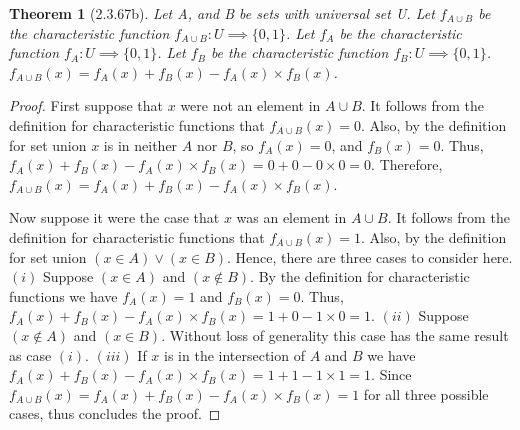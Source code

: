 \documentclass[a4paper, 12pt]{article}
\theoremstyle{plain}
\newtheorem*{theorem*}{Theorem}
\begin{document}
	
	\begin{theorem*}[2.3.67b]
		Let A, and B be sets with universal set U. Let $f_{A \cup B}$ be the characteristic 
		function $f_{A \cup B}: U \implies \{0, 1\}$. Let $f_{A}$ be the characteristic 
		function $f_{A}: U \implies \{0, 1\}$. Let $f_{B}$ be the characteristic function 
		\newline $f_{B}: U \implies \{0, 1\}$. \newline 
		$f_{A \cup B}(x) = f_{A}(x) + f_{B}(x) - f_{A}(x) \times f_{B}(x)$.
	\end{theorem*}
	
	\begin{proof}
		First suppose that $x$ were not an element in $A \cup B$. It follows from the definition 
		for characteristic functions that $f_{A \cup B}(x) = 0$. Also, by the definition for set 
		union $x$ is in neither $A$ nor $B$, so $f_{A}(x) = 0$, and $f_{B}(x) = 0$. Thus, 
		$f_{A}(x) + f_{B}(x) - f_{A}(x) \times f_{B}(x) = 0 + 0 - 0 \times 0 = 0$. Therefore, 
		$f_{A \cup B}(x) = f_{A}(x) + f_{B}(x) - f_{A}(x) \times f_{B}(x)$.
		
		Now suppose it were the case that $x$ was an element in $A \cup B$. It follows from the 
		definition for characteristic functions that $f_{A \cup B}(x) = 1$. Also, by the definition 
		for set union $(x \in A) \lor (x \in B)$. Hence, there are three cases to consider here. 
		\newline \newline \indent $(i)$ Suppose $(x \in A)$ and $(x \notin B)$. By the definition 
		for characteristic \indent functions we have $f_{A}(x) = 1$ and $f_{B}(x) = 0$. Thus, 
		\newline \indent $f_{A}(x) + f_{B}(x) - f_{A}(x) \times f_{B}(x) = 1 + 0 - 1 \times 0 = 1$. 
		\newline \newline \indent $(ii)$ Suppose $(x \notin A)$ and $(x \in B)$. Without loss of 
		generality this case \indent has the same result as case $(i)$. \newline \newline \indent 
		$(iii)$ If $x$ is in the intersection of $A$ and $B$ we have \newline \indent 
		$f_{A}(x) + f_{B}(x) - f_{A}(x) \times f_{B}(x) = 1 + 1 - 1 \times 1 = 1$. \newline \newline 
		Since $f_{A \cup B}(x) = f_{A}(x) + f_{B}(x) - f_{A}(x) \times f_{B}(x) = 1$ for all three 
		possible cases, thus concludes the proof.
	\end{proof}
\end{document}
